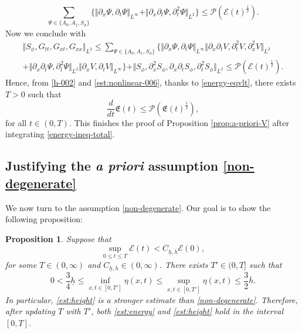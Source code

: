 \documentclass[reqno,11pt]{amsart}
\newcommand{\norm}[2]{\Vert #1 \Vert_{#2}}
\theoremstyle{plain}
\newtheorem{proposition}[theorem]{Proposition}
\theoremstyle{definition}
\numberwithin{equation}{section}
\begin{document}
\begin{equation}
    \label{est:nonlinear-005}
    \sum_{\Psi\in\lbrace A_0, A_1, S_\phi \rbrace}\lbrace \norm{\partial_x \Psi, \partial_t \Psi}{L^\infty} + \norm{ \partial_{x}\partial_t \Psi,\partial_{t}^2 \Psi}{L^2} \rbrace \leq  \mathcal P(\mathcal E(t)^{\frac{1}{2}}).
\end{equation}
Now we conclude with
\begin{equation}
    \label{est:nonlinear-006}
    \begin{gathered}
    \norm{S_\phi,G_{tt},G_{xt},G_{xx}}{L^2}  \leq \sum_{\Psi \in \lbrace A_0, A_1, S_\phi\rbrace} \bigl\lbrace \norm{\partial_x \Psi, \partial_t \Psi}{L^\infty} \norm{\partial_{x}\partial_tV,\partial_{t}^2V,\partial_{x}^2V}{L^2} \\
    +  \norm{\partial_{x}\partial_t \Psi, \partial_{t}^2 \Psi}{L^2} \norm{\partial_{x}V,\partial_{t}V}{L^\infty} \rbrace + \norm{S_\phi, \partial_{x}^2S_\phi, \partial_{x}\partial_t S_\phi, \partial_{t}^2 S_\phi}{L^2} 
    \leq  \mathcal P(\mathcal E(t)^{\frac{1}{2}}).
    \end{gathered}
\end{equation}
Hence, from \eqref{h-002} and \eqref{est:nonlinear-006}, thanks to \eqref{energy-eqvlt}, there exists $T>0$ such that
\begin{equation}
    \label{energy-ineq-total}
    \dfrac{d}{dt}\mathfrak E(t) \leq  \mathcal P(\mathfrak E(t)^{\frac{1}{2}}),
\end{equation}
for all $t\in (0,T)$. This finishes the proof of Proposition \ref{prop:a-priori-V} after integrating \eqref{energy-ineq-total}.


\subsection{Justifying the \textit{a priori} assumption \eqref{non-degenerate}}
\label{Justification}
We now turn to the assumption \eqref{non-degenerate}. Our goal is to show the following proposition:
\begin{proposition}
    \label{prop:a-priori-assumption}
    Suppose that 
    \begin{equation}
    \label{est:energy}
        \sup_{0\leq t \leq T} \mathcal E(t) < C_{\underline h, \overline h} \mathcal E(0),
    \end{equation}
    for some $ T \in(0,\infty) $ and $ C_{\underline h, \overline h} \in (0,\infty) $. There exists $ T'\in (0,T] $ such that 
    \begin{equation}
    \label{est:height}
       0<\frac{3}{4} \underline h \leq \inf_{x,t\in [0,T']} \eta(x,t) \leq \sup_{x,t\in [0,T']} \eta(x,t) \leq \frac{3}{2} \overline h.
    \end{equation}
    In particular, \eqref{est:height} is a stronger estimate than \eqref{non-degenerate}.
    Therefore, after updating $ T $ with $ T' $, both \eqref{est:energy} and \eqref{est:height} hold in the interval $ [0,T] $. 
\end{proposition}
\end{document}
